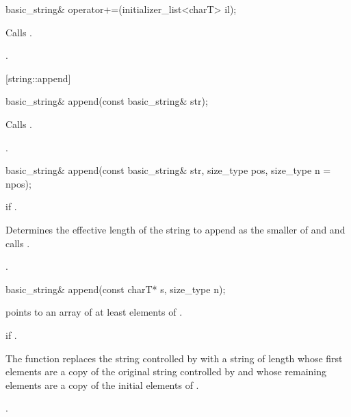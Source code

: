 %
%
\begin{itemdecl}
basic_string& operator+=(initializer_list<charT> il);
\end{itemdecl}

\begin{itemdescr}
\pnum
\effects Calls .

\pnum
\returns {}.
\end{itemdescr}


[string::append]{}

%
%
\begin{itemdecl}
basic_string&
  append(const basic_string& str);
\end{itemdecl}

\begin{itemdescr}
\pnum
\effects Calls .

\pnum
\returns
{}.
\end{itemdescr}

%
%
\begin{itemdecl}
basic_string&
  append(const basic_string& str, size_type pos, size_type n = npos);
\end{itemdecl}

\begin{itemdescr}
\pnum
\requires
{}

\pnum
\throws
{}
if
.

\pnum
\effects
Determines the effective length 
of the string to append as the smaller of  and
 and calls .

\pnum
\returns
{}.
\end{itemdescr}

%
%
\begin{itemdecl}
basic_string&
  append(const charT* s, size_type n);
\end{itemdecl}

\begin{itemdescr}
\pnum
\requires {} points to an array of at least  elements
of .

\pnum
\throws {} if .

\pnum
\effects The function replaces the string controlled by 
with a string of length  whose first 
elements are a copy of the original string controlled by 
and whose remaining elements are a copy of the initial  elements
of .

\pnum
\returns
{}.
\end{itemdescr}

